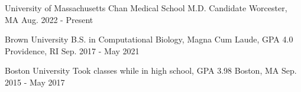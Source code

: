 
\begin{cventries}

  \cventry
  {University of Massachusetts Chan Medical School} %
  {M.D. Candidate} %
  {Worcester, MA} %
  {Aug. 2022 - Present} %
  {}

  \cventry
  {Brown University} %
  {B.S. in Computational Biology, Magna Cum Laude, GPA 4.0} %
  {Providence, RI} %
  {Sep. 2017 - May 2021} %
  {}

  \cventry
  {Boston University} %
  {Took classes while in high school, GPA 3.98} %
  {Boston, MA} %
  {Sep. 2015 - May 2017} %
  {}

\end{cventries}
